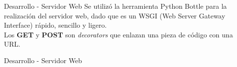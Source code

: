 \begin{frame}{Desarrollo - Servidor Web}
    \vspace{0cm}
    Se utilizó la herramienta Python Bottle para la realización del servidor web, dado que es un WSGI (Web Server Gateway Interface) rápido, sencillo y ligero.
    \\
    \vspace{0.5cm}
    Los \textbf{GET} y \textbf{POST} son \textit{decorators} que enlazan una pieza de código con una URL. 
    
\end{frame}

\begin{frame}{Desarrollo - Servidor Web}
    \vspace{0cm}
    \begin{figure}[ht]
       \centering
    \end{figure}
    \begin{figure}[ht]
       \centering
    \end{figure}

\end{frame}

